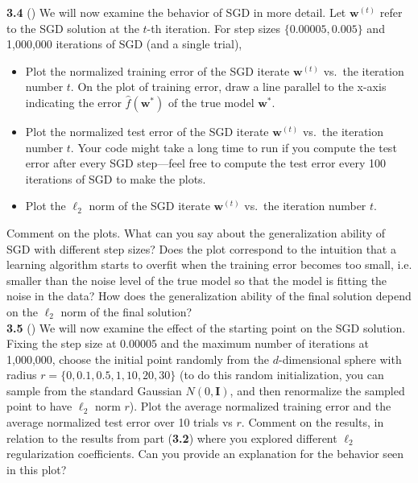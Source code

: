 \textbf{3.4} () We will now examine the behavior of SGD in more detail. Let $\mathbf{w}^{(t)}$ refer to the SGD solution at the $t$-th iteration. For step sizes $\{0.00005,0.005\}$ and 1,000,000 iterations of SGD (and a single trial), 
\begin{itemize}
\item [(i)] Plot the normalized training error of the SGD iterate $\mathbf{w}^{(t)}$ vs.\ the iteration
  number $t$. On the plot of training error, draw a line parallel to the
  x-axis indicating the error $\hat{f}(\textbf{w}^*)$ of
  the true model $\textbf{w}^*.$

	\item [(ii)] Plot the normalized test error of the SGD iterate $\mathbf{w}^{(t)}$ vs.\ the iteration number $t$. Your code might take a long time to run if you compute the test error after every SGD step---feel free to compute the test error every 100 iterations of SGD to make the plots.
	\item [(iii)] Plot the $\ell_2$ norm of the SGD iterate $\mathbf{w}^{(t)}$ vs.\
 the iteration number $t$.

\end{itemize}
  Comment on the plots. What can you say about the generalization ability of SGD with different step sizes? Does the plot correspond to the intuition that a learning algorithm starts to overfit when the training error becomes too small, i.e. smaller than the noise level of the true model so that the model is fitting the noise in the data? How does the generalization ability of the final solution depend on the $\ell_2$ norm of the final solution?\\

\textbf{3.5} () We will now examine the effect of the starting point on the SGD solution. Fixing the step size at $0.00005$ and the maximum number of iterations at 1,000,000, choose the initial point randomly from the $d$-dimensional sphere with radius $r=\{0, 0.1, 0.5, 1, 10, 20, 30\}$ (to do this random initialization, you can sample from the standard Gaussian $N(0,\mathbf{I})$, and then renormalize the sampled point to have $\ell_2$ norm $r$). Plot the average normalized training error and the average normalized test error over 10 trials vs $r$. Comment on the results, in relation to the results from part (\textbf{3.2}) where you explored different $\ell_2$ regularization coefficients. Can you provide an explanation for the behavior seen in this plot?\\
